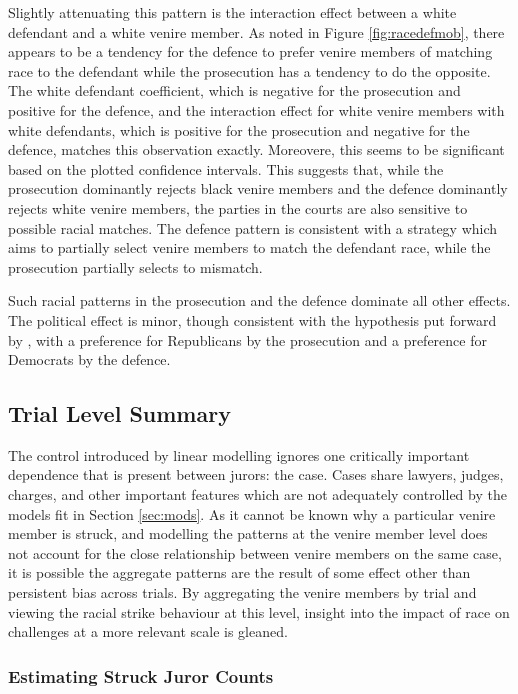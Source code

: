 Slightly attenuating this pattern is the interaction effect between a
white defendant and a white venire member. As noted in Figure
\ref{fig:racedefmob}, there appears to be a tendency for the defence to
prefer venire members of matching race to the defendant while the
prosecution has a tendency to do the opposite. The white defendant
coefficient, which is negative for the prosecution and positive for
the defence, and the interaction effect for white venire members with
white defendants, which is positive for the prosecution and negative
for the defence, matches this observation exactly. Moreovere, this seems to be significant based on the plotted confidence
intervals. This suggests that, while the prosecution dominantly rejects black venire
members and the defence dominantly rejects white venire members, the
parties in the courts are also sensitive to possible racial matches. The defence
pattern is consistent with a strategy which aims to partially select
venire members to match the defendant race, while the prosecution
partially selects to mismatch.

Such racial patterns in the prosecution and the defence dominate all other effects. The political effect is minor, though
consistent with the hypothesis put forward by \cite{revesz2016}, with a preference for Republicans by the prosecution and a
preference for Democrats by the defence.

\subsection{Trial Level Summary} \label{sec:casesum}

The control introduced by linear modelling ignores one critically important dependence that is present between jurors: the case. Cases share lawyers, judges, charges, and other important features which are not adequately controlled by the models fit in Section \ref{sec:mods}.  As it cannot be known why a particular venire member is struck, and modelling the patterns at the venire member level does not account for the close relationship between venire members on the same case, it is possible the aggregate patterns are the result
of some effect other than persistent bias across trials. By
aggregating the venire members by trial and viewing the racial strike
behaviour at this level, insight into the impact of race on challenges at a more relevant scale is gleaned.

\subsubsection{Estimating Struck Juror Counts} \label{subsec:struckjur}

